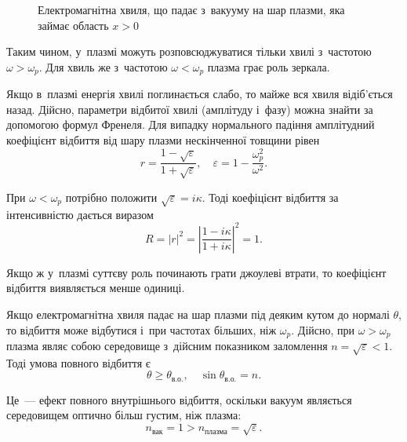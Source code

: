 \begin{figure}[h!]\centering
	\caption{Електромагнітна хвиля, що падає з~вакууму на шар плазми, яка займає область $x > 0$}
	\label{pic:wave-incidence}
\end{figure}

Таким чином, у~плазмі можуть розповсюджуватися тільки хвилі з~частотою $\omega > \omega_p$. Для хвиль же з~частотою $\omega < \omega_p$ плазма грає роль зеркала.

Якщо в~плазмі енергія хвилі поглинається слабо, то майже вся хвиля відіб'ється назад. Дійсно, параметри відбитої хвилі (амплітуду і~фазу) можна знайти за допомогою формул Френеля. Для випадку нормального падіння амплітудний коефіцієнт відбиття від шару плазми нескінченної товщини рівен
\begin{equation*}
	r = \frac{1 - \sqrt{\varepsilon}}{1 + \sqrt{\varepsilon}}, \quad \varepsilon = 1 - \frac{\omega_p^2}{\omega^2}.
\end{equation*}

При $\omega < \omega_p$ потрібно положити $\sqrt{\varepsilon} = i\kappa$. Тоді коефіцієнт відбиття за інтенсивністю дається виразом
\begin{equation*}
	R = |r|^2 = \left|\frac{1 - i\kappa}{1 + i\kappa}\right|^2 = 1.
\end{equation*}

Якщо ж у~плазмі суттєву роль починають грати джоулеві втрати, то коефіцієнт відбиття виявляється менше одиниці.

Якщо електромагнітна хвиля падає на шар плазми під деяким кутом до нормалі $\theta$, то відбиття може відбутися і~при частотах більших, ніж $\omega_p$. Дійсно, при $\omega > \omega_p$ плазма являє собою середовище з~дійсним показником заломлення $n = \sqrt{\varepsilon} < 1$. Тоді умова повного відбиття є
\begin{equation*}
	\theta \ge \theta_{\text{в.о.}}, \quad \sin\theta_{\text{в.о.}} = n.
\end{equation*}

Це~--- ефект повного внутрішнього відбиття, оскільки вакуум являється середовищем оптично більш густим, ніж плазма:
\begin{equation*}
	n_{\text{вак}} = 1 > n_{\text{плазма}} = \sqrt{\varepsilon}.
\end{equation*}

